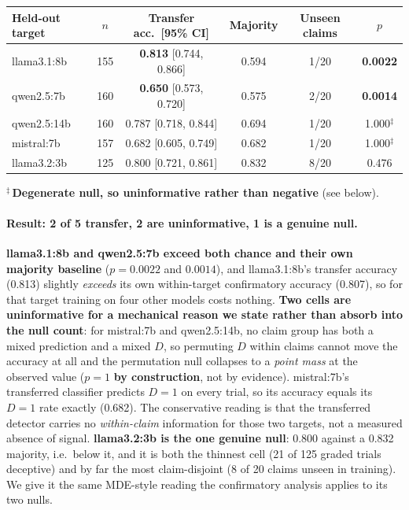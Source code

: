\begin{center}
\begin{scriptsize}
\setlength{\tabcolsep}{5pt}
\begin{tabular}{@{}lccccc@{}}
\toprule
\textbf{Held-out target} & $n$ & \textbf{Transfer acc.\ [95\% CI]} & \textbf{Majority} & \textbf{Unseen claims} & $p$ \\
\midrule
llama3.1:8b  & 155 & \textbf{0.813} [0.744, 0.866] & 0.594 & 1/20 & \textbf{0.0022} \\
qwen2.5:7b   & 160 & \textbf{0.650} [0.573, 0.720] & 0.575 & 2/20 & \textbf{0.0014} \\
\addlinespace[2pt]
qwen2.5:14b  & 160 & 0.787 [0.718, 0.844] & 0.694 & 1/20 & 1.000$^{\ddagger}$ \\
mistral:7b   & 157 & 0.682 [0.605, 0.749] & 0.682 & 1/20 & 1.000$^{\ddagger}$ \\
llama3.2:3b  & 125 & 0.800 [0.721, 0.861] & 0.832 & 8/20 & 0.476 \\
\bottomrule
\end{tabular}
\end{scriptsize}

\begin{scriptsize}
$^{\ddagger}$\,\textbf{Degenerate null, so uninformative rather than negative} (see below).
\end{scriptsize}
\end{center}

\paragraph{Result: 2 of 5 transfer, 2 are uninformative, 1 is a genuine null.} \textbf{llama3.1:8b and qwen2.5:7b exceed both chance and their own majority baseline} ($p\!=\!0.0022$ and $0.0014$), and llama3.1:8b's transfer accuracy (0.813) slightly \emph{exceeds} its own within-target confirmatory accuracy (0.807), so for that target training on four other models costs nothing. \textbf{Two cells are uninformative for a mechanical reason we state rather than absorb into the null count}: for mistral:7b and qwen2.5:14b, no claim group has both a mixed prediction and a mixed $D$, so permuting $D$ within claims cannot move the accuracy at all and the permutation null collapses to a \emph{point mass} at the observed value ($p\!=\!1$ \textbf{by construction}, not by evidence). mistral:7b's transferred classifier predicts $D\!=\!1$ on every trial, so its accuracy equals its $D\!=\!1$ rate exactly (0.682). The conservative reading is that the transferred detector carries no \emph{within-claim} information for those two targets, not a measured absence of signal. \textbf{llama3.2:3b is the one genuine null}: 0.800 against a 0.832 majority, i.e.\ below it, and it is both the thinnest cell (21 of 125 graded trials deceptive) and by far the most claim-disjoint (8 of 20 claims unseen in training). We give it the same MDE-style reading the confirmatory analysis applies to its two nulls.

